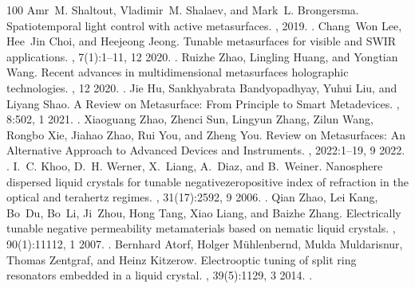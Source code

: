 \documentclass[a4paper,10pt,english,openany,oneside]{jupyterBook}
\begin{document}
\begin{sphinxthebibliography}{100}
\sphinxAtStartPar
Amr M. Shaltout, Vladimir M. Shalaev, and Mark L. Brongersma. Spatiotemporal light control with active metasurfaces. , 2019. .
\sphinxAtStartPar
Chang Won Lee, Hee Jin Choi, and Heejeong Jeong. Tunable metasurfaces for visible and SWIR applications. , 7(1):1–11, 12 2020. .
\sphinxAtStartPar
Ruizhe Zhao, Lingling Huang, and Yongtian Wang. Recent advances in multi\sphinxhyphen{}dimensional metasurfaces holographic technologies. , 12 2020. .
\sphinxAtStartPar
Jie Hu, Sankhyabrata Bandyopadhyay, Yu\sphinxhyphen{}hui Liu, and Li\sphinxhyphen{}yang Shao. A Review on Metasurface: From Principle to Smart Metadevices. , 8:502, 1 2021. .
\sphinxAtStartPar
Xiaoguang Zhao, Zhenci Sun, Lingyun Zhang, Zilun Wang, Rongbo Xie, Jiahao Zhao, Rui You, and Zheng You. Review on Metasurfaces: An Alternative Approach to Advanced Devices and Instruments. , 2022:1–19, 9 2022. .
\sphinxAtStartPar
I. C. Khoo, D. H. Werner, X. Liang, A. Diaz, and B. Weiner. Nanosphere dispersed liquid crystals for tunable negative\sphinxhyphen{}zero\sphinxhyphen{}positive index of refraction in the optical and terahertz regimes. , 31(17):2592, 9 2006. .
\sphinxAtStartPar
Qian Zhao, Lei Kang, Bo Du, Bo Li, Ji Zhou, Hong Tang, Xiao Liang, and Baizhe Zhang. Electrically tunable negative permeability metamaterials based on nematic liquid crystals. , 90(1):11112, 1 2007. .
\sphinxAtStartPar
Bernhard Atorf, Holger Mühlenbernd, Mulda Muldarisnur, Thomas Zentgraf, and Heinz Kitzerow. Electro\sphinxhyphen{}optic tuning of split ring resonators embedded in a liquid crystal. , 39(5):1129, 3 2014. .

\end{sphinxthebibliography}
\end{document}
